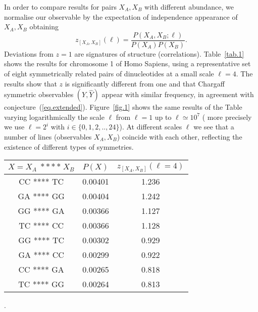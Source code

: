 \documentclass[fleqn,10pt]{wlscirep}
\begin{document}
In order to compare results for pairs $X_A,X_B$ with different abundance,  we  normalise our observable by the expectation of independence appearance of $X_A,X_B$ obtaining
%
\begin{equation}\label{eq.z}
z_{[X_A,X_B]}(\ell)=\frac{P(X_A,X_B; \ell)}{P(X_A)P(X_B)}.
\end{equation}
%
%
Deviations from $z=1$ are  signatures of structure (correlations). Table~\ref{tab.1} shows the results for chromosome 1 of  Homo Sapiens, using a representative set of eight symmetrically related  pairs of dinucleotides at a small scale $\ell = 4$. The results show that $z$ is significantly different from one and that Chargaff symmetric observables $(Y,\hat{Y})$ appear with similar frequency, in agreement with conjecture~(\ref{eq.extended}).  Figure~\ref{fig.1} shows the same results of the Table varying logarithmically the scale $\ell$ from   $\ell=1$ up to  $\ell \simeq 10^7$ ( more precisely we use $\ell =2^i$ with $i\in \{0,1,2,..,24\}$). At different scales $\ell$ we see that a number of lines (observables $X_A,X_B$) coincide with each other, reflecting the existence of different types of symmetries.
\begin{table*}
\begin{center}
\begin{tabular}{|c  | c | c |}
  \hline
 {$X=X_A\;****\;X_B$} & {$P(X)$} & {$z_{[X_A,X_B]}(\ell=4)$} \\ \hline\hline
  CC  **** TC & 0.00401 & 1.236 \\
  GA  ****  GG & 0.00404 & 1.242  \\\hline 
  GG  ****  GA & 0.00366 & 1.127  \\
  TC  ****  CC & 0.00366 & 1.128  \\\hline
  GG  ****  TC & 0.00302 & 0.929 \\
  GA  ****  CC & 0.00299 & 0.922   \\\hline
  CC  ****  GA & 0.00265 & 0.818  \\
  TC  ****  GG & 0.00264 & 0.813  \\\hline
  \end{tabular}
\caption{ \textbf{Chargaff symmetric observables appear with similar frequency in the human chromosome $1$}. Each line contains an observable $X$ constructed combining oligonucleotides $\alpha_1\alpha_2 \ldots \alpha_8$  where $\alpha_1\alpha_2$ equal to $X_A$ , $\alpha_3\alpha_4\alpha_5\alpha_6 $ are arbitrary (any in $\{A,C,T,G\}$), and $\alpha_7\alpha_8$ equal to $X_B$  . Observables related by the extended Chargaff symmetry~(\ref{EC}) appear on top of each other (separated by an horizontal line). The frequency of each observable $P(X)$ %
was computed using Eq.~(\ref{def.statisticsX}) and the normalized version (cross correlation) $z_{[X_A,X_B]}(\ell=4)$ using Eq.~(\ref{eq.z})}. \label{tab.1}
\end{center}
\end{table*}
\end{document}
